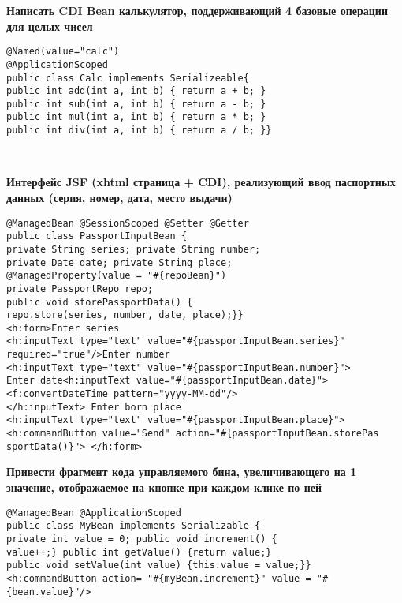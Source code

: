 \documentclass{article}
\begin{document}
\hfill
\begin{minipage}[t]{0.3\textwidth}
    \textbf{Написать CDI Bean калькулятор, поддерживающий 4 базовые операции для целых чисел}
    \begin{lstlisting}[frame=single, basicstyle=\tiny\ttfamily, breaklines=true, breakatwhitespace=true, postbreak=\mbox{\textcolor{red}{$\hookrightarrow$}\space}]
@Named(value="calc")
@ApplicationScoped
public class Calc implements Serializeable{
public int add(int a, int b) { return a + b; }
public int sub(int a, int b) { return a - b; }
public int mul(int a, int b) { return a * b; }
public int div(int a, int b) { return a / b; }}
    \end{lstlisting}
\end{minipage}%
\\

\begin{minipage}[t]{0.3\textwidth}
    \textbf{Интерфейс JSF (xhtml страница + CDI), реализующий ввод паспортных данных (серия, номер, дата, место выдачи)}
    \begin{lstlisting}[frame=single, basicstyle=\tiny\ttfamily, breaklines=true, breakatwhitespace=true, postbreak=\mbox{\textcolor{red}{$\hookrightarrow$}\space}]
@ManagedBean @SessionScoped @Setter @Getter 
public class PassportInputBean { 	
private String series; private String number; 	
private Date date; private String place; 	
@ManagedProperty(value = "#{repoBean}") 
private PassportRepo repo; 	
public void storePassportData() { 		
repo.store(series, number, date, place);}}
<h:form>Enter series	
<h:inputText type="text" value="#{passportInputBean.series}"
required="true"/>Enter number	
<h:inputText type="text" value="#{passportInputBean.number}"> 
Enter date<h:inputText value="#{passportInputBean.date}">
<f:convertDateTime pattern="yyyy-MM-dd"/> 	
</h:inputText> Enter born place 	
<h:inputText type="text" value="#{passportInputBean.place}">
<h:commandButton value="Send" action="#{passportInputBean.storePas
sportData()}"> </h:form>
    \end{lstlisting}
\end{minipage}%
\hfill
\begin{minipage}[t]{0.3\textwidth}
    \textbf{Привести фрагмент кода управляемого бина, увеличивающего на 1 значение, отображаемое на кнопке при каждом клике по ней}
    \begin{lstlisting}[frame=single, basicstyle=\tiny\ttfamily, breaklines=true, breakatwhitespace=true, postbreak=\mbox{\textcolor{red}{$\hookrightarrow$}\space}]
@ManagedBean @ApplicationScoped
public class MyBean implements Serializable {
private int value = 0; public void increment() {
value++;} public int getValue() {return value;}
public void setValue(int value) {this.value = value;}}
<h:commandButton action= "#{myBean.increment}" value = "#{bean.value}"/>
    \end{lstlisting}
\end{minipage}%
\end{document}
